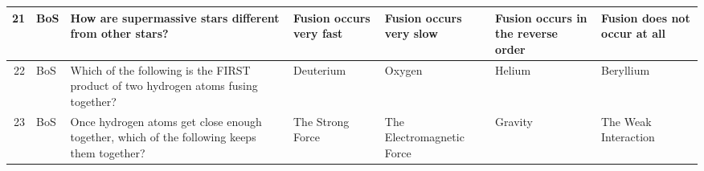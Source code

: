 \documentclass[10pt]{article}
\begin{document}
\begin{tiny}
\begin{longtable}{r|p{0.375in}|p{1.275in}|p{0.75in}|p{0.75in}|p{0.75in}|p{0.75in}}
    21    &     BoS &                                                                                                                                                                                                                           How are supermassive stars different from other stars? &                                                                                                               Fusion occurs very fast &                                                                               Fusion occurs very slow &                                                                                         Fusion occurs in the reverse order &                                                                                                      Fusion does not occur at all \\\hline
    22    &     BoS &                                                                                                                                                                                               Which of the following is the FIRST product of two hydrogen atoms fusing together? &                                                                                                                             Deuterium &                                                                                                Oxygen &                                                                                                                     Helium &                                                                                                                         Beryllium \\\hline
    23    &     BoS &                                                                                                                                                                                       Once hydrogen atoms get close enough together, which of the following keeps them together? &                                                                                                                      The Strong Force &                                                                             The Electromagnetic Force &                                                                                                                    Gravity &                                                                                                              The Weak Interaction \\\hline

\end{longtable}
\end{tiny}
\end{document}
